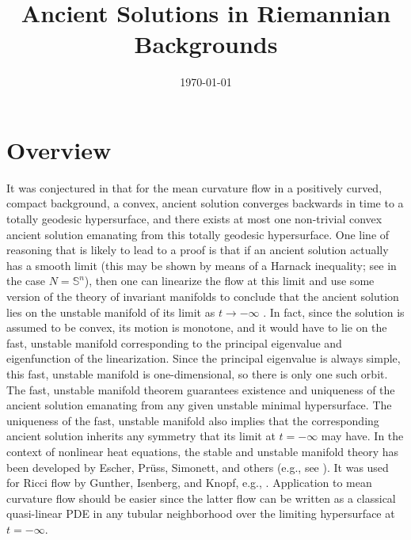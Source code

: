 \documentclass{amsart}
\begin{document}
\title[Ancient Solutions]
 {Ancient Solutions in Riemannian Backgrounds}

\curraddr{}
\email{}
\date{\today}

\dedicatory{}
\subjclass[2010]{}
\keywords{}

\begin{abstract}
\end{abstract}

\maketitle

\section{Overview}
\label{sec:overview}

It was conjectured in \cite{IvakiBryan} that for the mean curvature flow in a positively curved, compact background, a convex, ancient solution converges backwards in time to a totally geodesic hypersurface, and there exists at most one non-trivial convex ancient solution emanating from this totally geodesic hypersurface. One line of reasoning that is likely to lead to a proof is that if an ancient solution actually has a smooth limit (this may be shown by means of a Harnack inequality; see \cite{IvakiBryan} in the case $N=\mathbb{S}^n$), then one can linearize the flow at this limit and use some version of the theory of invariant manifolds to conclude that the ancient solution lies on the unstable manifold of its limit as $t\to-\infty$ \cite[Chapters 8, 9]{lunardi2012analytic}. In fact, since the solution is assumed to be convex, its motion is monotone, and it would have to lie on the fast, unstable manifold corresponding to the principal eigenvalue and eigenfunction of the linearization. Since the principal eigenvalue is always simple, this fast, unstable manifold is one-dimensional, so there is only one such orbit. The fast, unstable manifold theorem guarantees existence and uniqueness of the ancient solution emanating from any given unstable minimal hypersurface. The uniqueness of the fast, unstable manifold also implies that the corresponding ancient solution inherits any symmetry that its limit at $t=-\infty$ may have. In the context of nonlinear heat equations, the stable and unstable manifold theory has been developed by Escher, Pr\"{u}ss, Simonett, and others (e.g., see \cite{pruess2012invariant}). It was used for Ricci flow by Gunther, Isenberg, and Knopf, e.g., \cite{guenther2002stability}. Application to mean curvature flow should be easier since the latter flow can be written as a classical quasi-linear PDE in any tubular neighborhood over the limiting hypersurface at $t=-\infty$.
\end{document}
